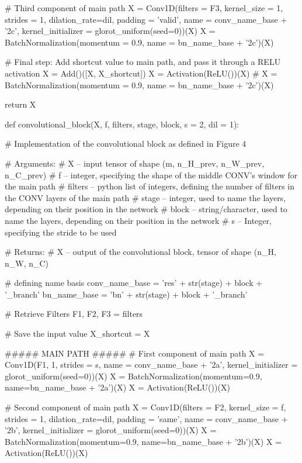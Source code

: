 \begin{python}
    # Third component of main path
    X = Conv1D(filters = F3, kernel_size = 1, strides = 1, dilation_rate=dil, padding = 'valid', name = conv_name_base + '2c', kernel_initializer = glorot_uniform(seed=0))(X)
    X = BatchNormalization(momentum = 0.9, name = bn_name_base + '2c')(X)

    # Final step: Add shortcut value to main path, and pass it through a RELU activation
    X = Add()([X, X_shortcut])
    X = Activation(ReLU())(X)
    # X = BatchNormalization(momentum = 0.9, name = bn_name_base + '2c')(X)
    
    return X

def convolutional_block(X, f, filters, stage, block, s = 2, dil = 1):

    # Implementation of the convolutional block as defined in Figure 4
    
    # Arguments:
    # X -- input tensor of shape (m, n_H_prev, n_W_prev, n_C_prev)
    # f -- integer, specifying the shape of the middle CONV's window for the main path
    # filters -- python list of integers, defining the number of filters in the CONV layers of the main path
    # stage -- integer, used to name the layers, depending on their position in the network
    # block -- string/character, used to name the layers, depending on their position in the network
    # s -- Integer, specifying the stride to be used
    
    # Returns:
    # X -- output of the convolutional block, tensor of shape (n_H, n_W, n_C)
    
    # defining name basis
    conv_name_base = 'res' + str(stage) + block + '_branch'
    bn_name_base = 'bn' + str(stage) + block + '_branch'
    
    # Retrieve Filters
    F1, F2, F3 = filters
    
    # Save the input value
    X_shortcut = X


    ##### MAIN PATH #####
    # First component of main path 
    X = Conv1D(F1, 1, strides = s, name = conv_name_base + '2a', kernel_initializer = glorot_uniform(seed=0))(X)
    X = BatchNormalization(momentum=0.9, name=bn_name_base + '2a')(X)
    X = Activation(ReLU())(X)
    
    # Second component of main path
    X = Conv1D(filters = F2, kernel_size = f, strides = 1, dilation_rate=dil, padding = 'same', name = conv_name_base + '2b', kernel_initializer = glorot_uniform(seed=0))(X)
    X = BatchNormalization(momentum=0.9, name=bn_name_base + '2b')(X)
    X = Activation(ReLU())(X)


\end{python}
